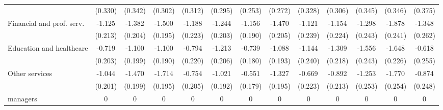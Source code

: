 {\begin{tabular}{l*{12}{c}}
                    &     (0.330)         &     (0.342)         &     (0.302)         &     (0.312)         &     (0.295)         &     (0.253)         &     (0.272)         &     (0.328)         &     (0.306)         &     (0.345)         &     (0.346)         &     (0.375)         \\
[1em]
Financial and prof. serv.&      -1.125\sym{***}&      -1.382\sym{***}&      -1.500\sym{***}&      -1.188\sym{***}&      -1.244\sym{***}&      -1.156\sym{***}&      -1.470\sym{***}&      -1.121\sym{***}&      -1.154\sym{***}&      -1.298\sym{***}&      -1.878\sym{***}&      -1.348\sym{***}\\
                    &     (0.213)         &     (0.204)         &     (0.195)         &     (0.223)         &     (0.203)         &     (0.190)         &     (0.205)         &     (0.239)         &     (0.224)         &     (0.243)         &     (0.241)         &     (0.262)         \\
[1em]
Education and healthcare&      -0.719\sym{***}&      -1.100\sym{***}&      -1.100\sym{***}&      -0.794\sym{***}&      -1.213\sym{***}&      -0.739\sym{***}&      -1.088\sym{***}&      -1.144\sym{***}&      -1.309\sym{***}&      -1.556\sym{***}&      -1.648\sym{***}&      -0.618\sym{*}  \\
                    &     (0.203)         &     (0.199)         &     (0.190)         &     (0.220)         &     (0.206)         &     (0.180)         &     (0.193)         &     (0.240)         &     (0.218)         &     (0.243)         &     (0.226)         &     (0.255)         \\
[1em]
Other services      &      -1.044\sym{***}&      -1.470\sym{***}&      -1.714\sym{***}&      -0.754\sym{***}&      -1.021\sym{***}&      -0.551\sym{**} &      -1.327\sym{***}&      -0.669\sym{**} &      -0.892\sym{***}&      -1.253\sym{***}&      -1.770\sym{***}&      -0.874\sym{***}\\
                    &     (0.201)         &     (0.199)         &     (0.195)         &     (0.205)         &     (0.192)         &     (0.179)         &     (0.195)         &     (0.223)         &     (0.213)         &     (0.253)         &     (0.254)         &     (0.248)         \\
[1em]
managers            &           0         &           0         &           0         &           0         &           0         &           0         &           0         &           0         &           0         &           0         &           0         &           0         \\

\end{tabular}}
